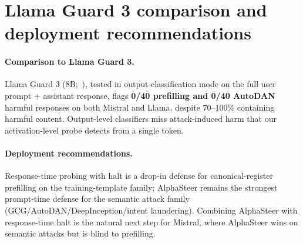 \documentclass{article}
\begin{document}
\section{Llama Guard 3 comparison and deployment recommendations}
\label{app:llamaguard}

\paragraph{Comparison to Llama Guard 3.}
Llama Guard 3 (8B;~\citet{llamaguard2024}), tested in output-classification mode on the full user prompt + assistant response, flags \textbf{0/40 prefilling and 0/40 AutoDAN} harmful responses on both Mistral and Llama, despite 70--100\% containing harmful content. Output-level classifiers miss attack-induced harm that our activation-level probe detects from a single token.

\paragraph{Deployment recommendations.}
Response-time probing with halt is a drop-in defense for canonical-register prefilling on the training-template family; AlphaSteer remains the strongest prompt-time defense for the semantic attack family (GCG/AutoDAN/DeepInception/intent laundering). Combining AlphaSteer with response-time halt is the natural next step for Mistral, where AlphaSteer wins on semantic attacks but is blind to prefilling.

\newpage

\end{document}
